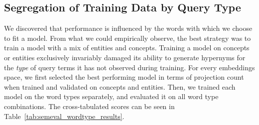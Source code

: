 \subsection{Segregation of Training Data by Query Type}
We discovered that performance is influenced by the words with which we choose to fit a model.  From what we could empirically observe, the best strategy was to train a model with a mix of entities and concepts.  Training a model on concepts or entities exclusively invariably damaged its ability to generate hypernyms for the \textit{type} of query terms it has not observed during training.  For every embeddings space, we first selected the best performing model in terms of projection count when trained and validated on concepts and entities.  Then, we trained each model on the word types separately, and evaluated it on all word type combinations.  The cross-tabulated scores can be seen in Table~\ref{tab:semeval_wordtype_results}.
